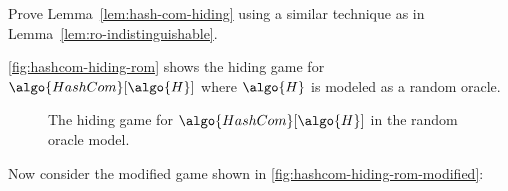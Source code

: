 \begin{exercise}\label{ex:hash-com-hiding}
  Prove Lemma~\ref{lem:hash-com-hiding} using a similar technique as in Lemma~\ref{lem:ro-indistinguishable}.
\end{exercise}

\ifsolutions
\begin{mysolution}
\autoref{fig:hashcom-hiding-rom} shows the hiding game for $\algo{HashCom}[\algo{H}]$ where $\algo{H}$ is modeled as a random oracle.

\begin{figure}[h]
  \begin{center}
    \begin{tcolorbox}[width=8cm]
      \begin{pchstack}
        \pchspace
      \end{pchstack}
    \end{tcolorbox}
  \end{center}
  \caption{The hiding game for $\algo{HashCom}[\algo{H}]$ in the random oracle model.}
  \label{fig:hashcom-hiding-rom}
\end{figure}

Now consider the modified game shown in \autoref{fig:hashcom-hiding-rom-modified}:


\end{mysolution}
